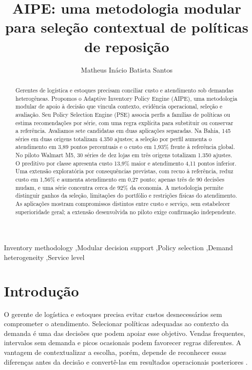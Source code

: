 \documentclass[preprint,12pt]{elsarticle}
\begin{document}
\begin{frontmatter}
\title{AIPE: uma metodologia modular para seleção contextual de políticas de reposição}
\author[ufal]{Matheus Inácio Batista Santos}
\begin{abstract}
Gerentes de logística e estoques precisam conciliar custo e atendimento sob demandas heterogêneas. Propomos o Adaptive Inventory Policy Engine (AIPE), uma metodologia modular de apoio à decisão que vincula contexto, evidência operacional, seleção e avaliação. Seu Policy Selection Engine (PSE) associa perfis a famílias de políticas ou estima recomendações por série, com uma regra explícita para substituir ou conservar a referência. Avaliamos sete candidatas em duas aplicações separadas. Na Bahia, 145 séries em duas origens totalizam 4.350 ajustes; a seleção por perfil aumenta o atendimento em 3,89 pontos percentuais e o custo em 1,93\% frente à referência global. No piloto Walmart M5, 30 séries de dez lojas em três origens totalizam 1.350 ajustes. O preditivo por classe apresenta custo 13,9\% maior e atendimento 4,11 pontos inferior. Uma extensão exploratória por consequências previstas, com recuo à referência, reduz custo em 1,56\% e aumenta atendimento em 0,27 ponto; apenas três de 90 decisões mudam, e uma série concentra cerca de 92\% da economia. A metodologia permite distinguir ganhos da seleção, limitações do portfólio e restrições físicas do atendimento. As aplicações mostram compromissos distintos entre custo e serviço, sem estabelecer superioridade geral; a extensão desenvolvida no piloto exige confirmação independente.

\end{abstract}
\begin{keyword}
Inventory methodology \sep Modular decision support \sep Policy selection \sep Demand heterogeneity \sep Service level
\end{keyword}
\end{frontmatter}

\section{Introdução}
O gerente de logística e estoques precisa evitar custos desnecessários sem comprometer o atendimento. Selecionar políticas adequadas ao contexto da demanda é uma das decisões que podem apoiar esse objetivo. Vendas frequentes, intervalos sem demanda e picos ocasionais podem favorecer regras diferentes. A vantagem de contextualizar a escolha, porém, depende de reconhecer essas diferenças antes da decisão e convertê-las em resultados operacionais posteriores \cite{Axsater2006InventoryControl}.
\end{document}
